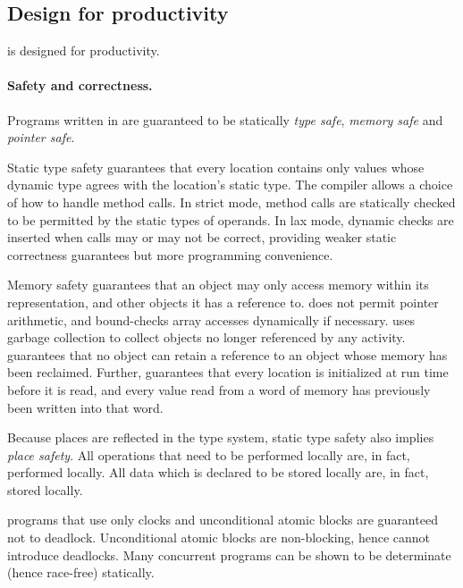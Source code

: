\subsection{Design for productivity}
\Xten{} is designed for productivity.

\paragraph{Safety and correctness.}


Programs written in \Xten{} are guaranteed to be statically
\emph{type safe}, \emph{memory safe} and \emph{pointer safe}. 

Static type safety guarantees that every location contains only values whose
dynamic type agrees with the location's static type. The compiler allows a
choice of how to handle method calls. In strict mode, method calls are
statically checked to be permitted by the static types of operands. In lax
mode, dynamic checks are inserted when calls may or may not be correct,
providing weaker static correctness guarantees but more programming
convenience. 

Memory safety guarantees that an object may only access memory within its
representation, and other objects it has a reference to. \Xten{} does not
permit 
pointer arithmetic, and bound-checks array accesses dynamically if necessary.
\Xten{} uses garbage collection to collect objects no longer referenced by any
activity. \Xten{} guarantees that no object can retain a reference to an
object whose memory has been reclaimed. Further, \Xten{} guarantees that every
location is initialized at run time before it is read, and every value read
from a word of memory has previously been written into that word.


Because places are reflected in the type system, static type safety
also implies \emph{place safety}. All operations that need to be performed
locally are, in fact, performed locally.  All data which is declared to be
stored locally are, in fact, stored locally.

\Xten{} programs that use only clocks and unconditional atomic
blocks are guaranteed not to deadlock. Unconditional atomic blocks
are non-blocking, hence cannot introduce deadlocks.
Many concurrent programs can be shown to be determinate (hence
race-free) statically.

